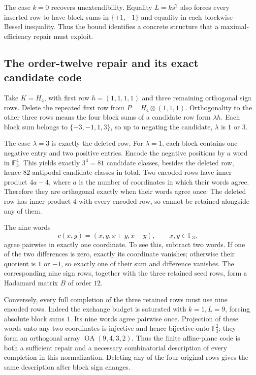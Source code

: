 The case $k=0$ recovers unextendibility. Equality $L=ks^2$ also forces
every inserted row to have block sums in $\{+1,-1\}$ and equality in
each blockwise Bessel inequality. Thus the bound identifies a concrete
structure that a maximal-efficiency repair must exploit.

\subsection{The order-twelve repair and its exact candidate code}
Take $K=H_4$, with first row $h=(1,1,1,1)$ and three remaining
orthogonal sign rows. Delete the repeated first row from
$P=H_4\otimes(1,1,1)$. Orthogonality to the other three rows means
the four block sums of a candidate row form $\lambda h$.
Each block sum belongs to $\{-3,-1,1,3\}$, so up to negating the
candidate, $\lambda$ is $1$ or $3$.

The case $\lambda=3$ is exactly the deleted row. For $\lambda=1$,
each block contains one negative entry and two positive entries.
Encode the negative positions by a word in $\mathbb F_3^4$.
This yields exactly $3^4=81$ candidate classes, besides the deleted
row, hence $82$ antipodal candidate classes in total.
Two encoded rows have inner product $4a-4$, where $a$ is the number
of coordinates in which their words agree. Therefore they are
orthogonal exactly when their words agree once. The deleted row
has inner product $4$ with every encoded row, so cannot be retained
alongside any of them.

The nine words
\[
 c(x,y)=(x,y,x+y,x-y),\qquad x,y\in\mathbb F_3,
\]
agree pairwise in exactly one coordinate. To see this, subtract two
words. If one of the two differences is zero, exactly its coordinate
vanishes; otherwise their quotient is $1$ or $-1$, so exactly one
of their sum and difference vanishes. The corresponding nine sign
rows, together with the three retained seed rows, form a Hadamard
matrix $B$ of order $12$.

Conversely, every full completion of the three retained rows must
use nine encoded rows. Indeed the exchange budget is saturated with
$k=1,L=9$, forcing absolute block sums $1$. Its nine words agree
pairwise once. Projection of these words onto any two coordinates is
injective and hence bijective onto $\mathbb F_3^2$; they form an
orthogonal array $\operatorname{OA}(9,4,3,2)$.
Thus the finite affine-plane code is both a sufficient repair and a
necessary combinatorial description of every completion in this
normalization. Deleting any of the four original rows gives the same
description after block sign changes.


